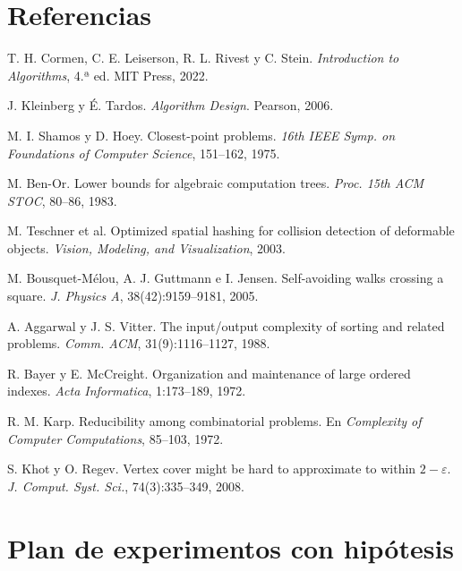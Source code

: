 \documentclass[11pt,letterpaper]{article}
\theoremstyle{plain}
\theoremstyle{definition}
\begin{document}
\section*{Referencias}
\begin{enumerate}[label={[\arabic*]},leftmargin=*,itemsep=0pt]
\footnotesize
\item T. H. Cormen, C. E. Leiserson, R. L. Rivest y C. Stein. \emph{Introduction to Algorithms}, 4.ª ed. MIT Press, 2022.
\item J. Kleinberg y É. Tardos. \emph{Algorithm Design}. Pearson, 2006.
\item M. I. Shamos y D. Hoey. Closest-point problems. \emph{16th IEEE Symp. on Foundations of Computer Science}, 151--162, 1975.
\item M. Ben-Or. Lower bounds for algebraic computation trees. \emph{Proc. 15th ACM STOC}, 80--86, 1983.
\item M. Teschner et al. Optimized spatial hashing for collision detection of deformable objects. \emph{Vision, Modeling, and Visualization}, 2003.
\item M. Bousquet-Mélou, A. J. Guttmann e I. Jensen. Self-avoiding walks crossing a square. \emph{J. Physics A}, 38(42):9159--9181, 2005.
\item A. Aggarwal y J. S. Vitter. The input/output complexity of sorting and related problems. \emph{Comm. ACM}, 31(9):1116--1127, 1988.
\item R. Bayer y E. McCreight. Organization and maintenance of large ordered indexes. \emph{Acta Informatica}, 1:173--189, 1972.
\item R. M. Karp. Reducibility among combinatorial problems. En \emph{Complexity of Computer Computations}, 85--103, 1972.
\item S. Khot y O. Regev. Vertex cover might be hard to approximate to within $2-\varepsilon$. \emph{J. Comput. Syst. Sci.}, 74(3):335--349, 2008.
\end{enumerate}
\clearpage
\appendix

\section{Plan de experimentos con hipótesis}\label{anexo:plan}
\end{document}
